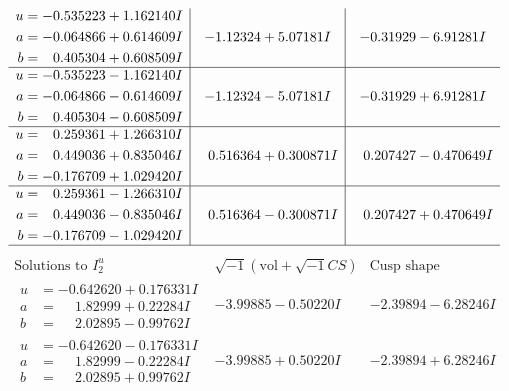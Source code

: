 \documentclass[1p]{elsarticle_modified}
\theoremstyle{definition}
\newcommand{\I}{\sqrt{-1}}
\begin{document}
$$\begin{array}{c|c|c}
\begin{aligned}
u &= -0.535223 + 1.162140 I \\
a &= -0.064866 + 0.614609 I \\
b &= \phantom{-}0.405304 + 0.608509 I\end{aligned}
 & -1.12324 + 5.07181 I & -0.31929 - 6.91281 I \\ \hline\begin{aligned}
u &= -0.535223 - 1.162140 I \\
a &= -0.064866 - 0.614609 I \\
b &= \phantom{-}0.405304 - 0.608509 I\end{aligned}
 & -1.12324 - 5.07181 I & -0.31929 + 6.91281 I \\ \hline\begin{aligned}
u &= \phantom{-}0.259361 + 1.266310 I \\
a &= \phantom{-}0.449036 + 0.835046 I \\
b &= -0.176709 + 1.029420 I\end{aligned}
 & \phantom{-}0.516364 + 0.300871 I & \phantom{-}0.207427 - 0.470649 I \\ \hline\begin{aligned}
u &= \phantom{-}0.259361 - 1.266310 I \\
a &= \phantom{-}0.449036 - 0.835046 I \\
b &= -0.176709 - 1.029420 I\end{aligned}
 & \phantom{-}0.516364 - 0.300871 I & \phantom{-}0.207427 + 0.470649 I\\
 \hline 
 \end{array}$$\newpage$$\begin{array}{c|c|c}  
\text{Solutions to }I^u_{2}& \I (\text{vol} + \sqrt{-1}CS) & \text{Cusp shape}\\
 \hline 
\begin{aligned}
u &= -0.642620 + 0.176331 I \\
a &= \phantom{-}1.82999 + 0.22284 I \\
b &= \phantom{-}2.02895 - 0.99762 I\end{aligned}
 & -3.99885 - 0.50220 I & -2.39894 - 6.28246 I \\ \hline\begin{aligned}
u &= -0.642620 - 0.176331 I \\
a &= \phantom{-}1.82999 - 0.22284 I \\
b &= \phantom{-}2.02895 + 0.99762 I\end{aligned}
 & -3.99885 + 0.50220 I & -2.39894 + 6.28246 I \\ \hline\begin{aligned}

\end{aligned}
\end{array}$$
\end{document}
